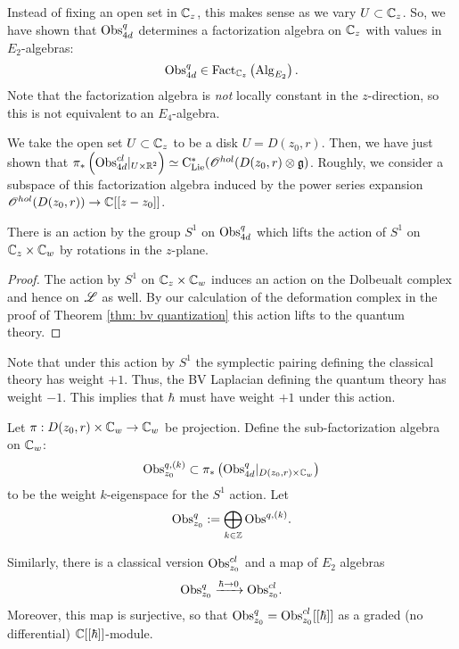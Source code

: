 \documentclass[11pt]{amsart}
\begin{document}
\begin{rmk}
Instead of fixing an open set in $\mathbb C_z$, this makes sense as we vary $U \subset \mathbb C_z$.
So, we have shown that ${\rm Obs}^{q}_{4d}$ determines a factorization algebra on $\mathbb C_z$ with values in $E_2$-algebras:
\[
{\rm Obs}^q_{4d} \in {\rm Fact}_{\mathbb C_z}\left({\rm Alg}_{E_2}\right) .
\]
Note that the factorization algebra is {\em not} locally constant in the $z$-direction, so this is not equivalent to an $E_4$-algebra.
\end{rmk}

We take the open set $U \subset \mathbb C_z$ to be a disk $U = D(z_0,r)$. 
Then, we have just shown that $\pi_*\left({\rm Obs}^{cl}_{4d}|_{U \times \mathbb R^2}\right) \simeq {\rm C}_{{\rm Lie}}^*(\mathscr O^{hol}(D(z_0,r) \otimes \mathfrak g)$. 
Roughly, we consider a subspace of this factorization algebra induced by the power series expansion $\mathscr O^{hol}(D(z_0,r)) \to \mathbb C[[z-z_0]]$. 

\begin{lem}
There is an action by the group $S^1$ on ${\rm Obs}^{q}_{4d}$ which lifts the action of $S^1$ on $\mathbb C_z \times \mathbb C_w$ by rotations in the $z$-plane.
\end{lem}
\begin{proof}
The action by $S^1$ on $\mathbb C_z \times \mathbb C_w$ induces an action on the Dolbeualt complex and hence on $\mathscr L$ as well. 
By our calculation of the deformation complex in the proof of Theorem \ref{thm: bv quantization} this action lifts to the quantum theory. 
\end{proof}

\begin{rmk}
Note that under this action by $S^1$ the symplectic pairing defining the classical theory has weight $+1$. 
Thus, the BV Laplacian defining the quantum theory has weight $-1$. 
This implies that $\hbar$ must have weight $+1$ under this action.
\end{rmk}

\begin{dfn}
Let $\pi : D(z_0,r) \times \mathbb C_w \to \mathbb C_w$ be projection.
Define the sub-factorization algebra on $\mathbb C_w$:
\[
{\rm Obs}^{q,(k)}_{z_0} \subset \pi_*\left({\rm Obs}^{q}_{4d}|_{D(z_0,r) \times \mathbb C_w}\right)
\]
to be the weight $k$-eigenspace for the $S^1$ action. 
Let
\[
{\rm Obs}^q_{z_0} := \bigoplus_{k \in \mathbb Z} {\rm Obs}^{q,(k)}. 
\] 
\end{dfn}

Similarly, there is a classical version ${\rm Obs}^{cl}_{z_0}$ and a map of $E_2$ algebras
\[
{\rm Obs}^{q}_{z_0} \xrightarrow{\hbar \to 0} {\rm Obs}^{cl}_{z_0} .
\]
Moreover, this map is surjective, so that ${\rm Obs}^{q}_{z_0} = {\rm Obs}^{cl}_{z_0} [[\hbar]]$ as a graded (no differential) $\mathbb C[[\hbar]]$-module. 
 
\end{document}
